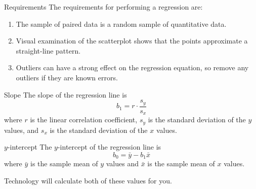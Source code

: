 \documentclass{beamer}
\begin{document}
\begin{frame}
\begin{block}{Requirements}
The requirements for performing a regression are:
\begin{enumerate}
\item The sample of paired data is a random sample of quantitative data.\pause
\item Visual examination of the scatterplot shows that the points approximate a straight-line pattern.\pause
\item Outliers can have a strong effect on the regression equation, so remove any outliers if they are known errors.
\end{enumerate}
\end{block}
\end{frame}

\begin{frame}
\begin{block}{Slope}
The slope of the regression line is
\begin{equation*}
b_1=r\cdot\dfrac{s_y}{s_x}
\end{equation*}
where $r$ is the linear correlation coefficient, $s_y$ is the standard deviation of the $y$ values, and $s_x$ is the standard deviation of the $x$ values.
\end{block}\pause

\begin{block}{$y$-intercept}
The $y$-intercept of the regression line is
\begin{equation*}
b_0=\bar{y}-b_1\bar{x}
\end{equation*}
where $\bar{y}$ is the sample mean of $y$ values and $\bar{x}$ is the sample mean of $x$ values.
\end{block}\pause

\begin{note}
Technology will calculate both of these values for you.
\end{note}
\end{frame}
\end{document}
